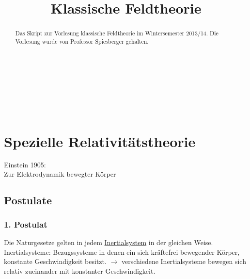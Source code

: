 \documentclass[a4paper]{article}
\title{Klassische Feldtheorie}
\author{}
\date{}
\begin{document}
\maketitle
\begin{verbatim}






\end{verbatim}
\begin{abstract}
Das Skript zur Vorlesung klassische Feldtheorie im Wintersemester 2013/14. Die Vorlesung wurde von Professor Spiesberger gehalten.
\end{abstract}
\newpage
\tableofcontents
\setcounter{tocdepth}{5}
\newpage

\section{Spezielle Relativitätstheorie}

Einstein 1905:\\
Zur Elektrodynamik bewegter Körper

\subsection{Postulate}
\subsubsection{1. Postulat}
Die Naturgesetze gelten in jedem
\underline{Inertialsystem} in der gleichen Weise.\\
Inertialsysteme: Bezugssysteme in denen ein sich kräftefrei bewegender Körper,
konstante Geschwindigkeit besitzt.
$\rightarrow$ verschiedene Inertialsysteme bewegen sich relativ zueinander mit
konstanter Geschwindigkeit.
\end{document}
